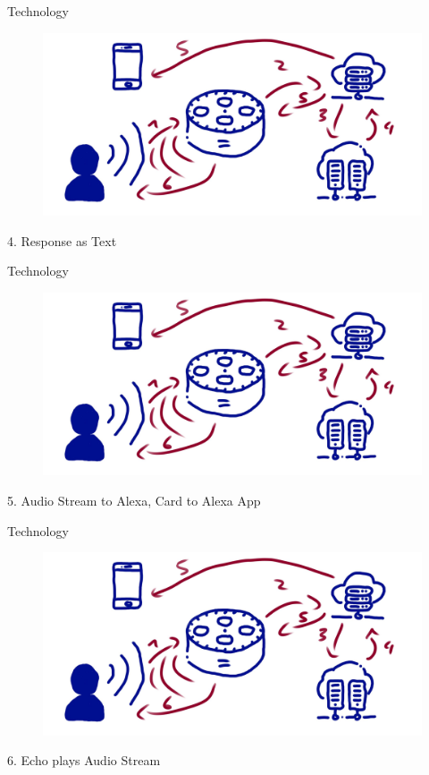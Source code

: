 \documentclass[aspectratio=169]{beamer}
\begin{document}
\begin{frame}{Technology}
\begin{figure}
	\includegraphics[width=0.9\linewidth]{images/alexatech}
\end{figure}
4. Response as Text
\end{frame}

\begin{frame}{Technology}
\begin{figure}
	\includegraphics[width=0.9\linewidth]{images/alexatech}
\end{figure}
5. Audio Stream to Alexa, Card to Alexa App
\end{frame}

\begin{frame}{Technology}
\begin{figure}
	\includegraphics[width=0.9\linewidth]{images/alexatech}
\end{figure}
6. Echo plays Audio Stream
\end{frame}
\end{document}
